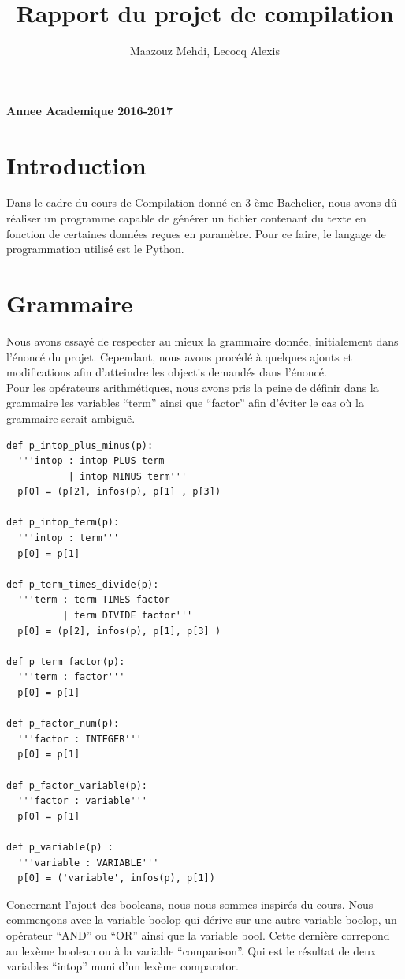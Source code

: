 \documentclass[10pt,a4paper]{article}
\title{Rapport du projet de compilation}
\author{Maazouz Mehdi, Lecocq Alexis}
\begin{document}
\maketitle
\textbf{Annee Academique 2016-2017}\\
\tableofcontents
\newpage

\section{Introduction}
Dans le cadre du cours de Compilation donné en 3 ème Bachelier, nous avons dû réaliser un programme
capable de générer un fichier contenant du texte en fonction de certaines données reçues en paramètre.
Pour ce faire, le langage de programmation utilisé est le Python.
\section{Grammaire}
Nous avons essayé de respecter au mieux la grammaire donnée, initialement dans l'énoncé du projet.
Cependant, nous avons procédé à quelques ajouts et modifications afin d'atteindre les objectis demandés dans 
l'énoncé.\\
Pour les opérateurs arithmétiques, nous avons pris la peine de définir dans la grammaire les variables ``term'' ainsi que ``factor'' afin d'éviter
le cas où la grammaire serait ambiguë.\\
\begin{lstlisting}
def p_intop_plus_minus(p):
  '''intop : intop PLUS term
           | intop MINUS term'''
  p[0] = (p[2], infos(p), p[1] , p[3])

def p_intop_term(p):
  '''intop : term'''
  p[0] = p[1]

def p_term_times_divide(p):
  '''term : term TIMES factor
          | term DIVIDE factor'''
  p[0] = (p[2], infos(p), p[1], p[3] )

def p_term_factor(p):
  '''term : factor'''
  p[0] = p[1]

def p_factor_num(p):
  '''factor : INTEGER'''
  p[0] = p[1]

def p_factor_variable(p):
  '''factor : variable'''
  p[0] = p[1]

def p_variable(p) :
  '''variable : VARIABLE'''
  p[0] = ('variable', infos(p), p[1])

\end{lstlisting}
\newpage
Concernant l'ajout des booleans, nous nous sommes inspirés du cours. Nous commençons avec la variable boolop qui dérive sur une autre variable
boolop, un opérateur ``AND'' ou ``OR'' ainsi que la variable bool. Cette dernière correpond au lexème boolean ou à la variable ``comparison''.
Qui est le résultat de deux variables ``intop'' muni d'un lexème comparator.
\end{document}
